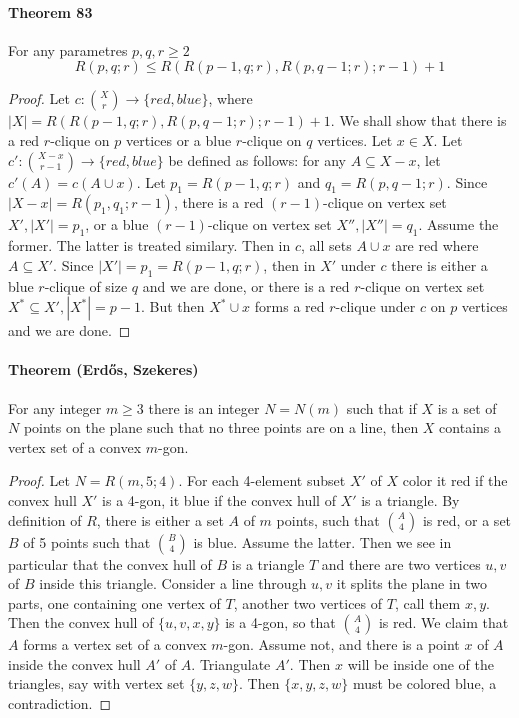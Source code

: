 \paragraph{Theorem 83} For any parametres $p,q,r \geq 2$
$$ R(p,q;r) \leq R(R(p-1,q;r), R(p,q-1;r);r-1) + 1 $$ 
\begin{proof}
    Let $c: \binom{X}{r} \to \{red,blue\}$, where 
    $|X| = R(R(p-1,q;r), R(p,q-1;r);r-1) + 1$. We shall show that there is a 
    red $r$-clique on $p$ vertices or a blue $r$-clique on $q$ vertices.
    Let $x \in X$. Let $c': \binom{X-x}{r-1} \to \{red,blue\}$ be defined 
    as follows: for any $A \subseteq X - x$, let $c'(A) = c(A \cup x)$. Let 
    $p_1 = R(p-1,q;r)$ and $q_1 = R(p,q-1;r)$. Since $|X-x| = R(p_1,q_1;r-1)$,
    there is a red $(r-1)$-clique on vertex set $X', |X'| = p_1$, or a blue 
    $(r-1)$-clique on vertex set $X'', |X''| = q_1$. Assume the former. The 
    latter is treated similary. Then in $c$, all sets $A \cup x$ are red where
    $A \subseteq X'$. Since $|X'| = p_1 = R(p-1,q;r)$, then in $X'$ under $c$
    there is either a blue $r$-clique of size $q$ and we are done, or there is 
    a red $r$-clique on vertex set $X^* \subseteq X', |X^*| = p-1$. But then
    $X^* \cup x$ forms a red $r$-clique under $c$ on $p$ vertices 
    and we are done.
\end{proof}

\paragraph{Theorem (Erd\H{o}s, Szekeres)} For any integer $m \geq 3$ there is 
an integer $N = N(m)$ such that if $X$ is a set of $N$ points on the plane 
such that no three points are on a line, then $X$ contains a vertex set
of a convex $m$-gon.
\begin{proof}
   Let $N = R(m,5;4)$. For each 4-element subset $X'$ of $X$ color it red if
   the convex hull $X'$ is a 4-gon, it blue if the convex hull of $X'$ is a 
   triangle. By definition of $R$, there is either a set $A$ of $m$ points, 
   such that $\binom{A}{4}$ is red, or a set $B$ of 5 points such that 
   $\binom{B}{4}$ is blue. Assume the latter. Then we see in particular that 
   the convex hull of $B$ is a triangle $T$ and there are two vertices $u,v$
   of $B$ inside this triangle. Consider a line through $u,v$ it splits the 
   plane in two parts, one containing one vertex of $T$, another 
   two vertices of $T$, call them $x,y$. Then the convex hull of $\{u,v,x,y\}$
   is a 4-gon, so that $\binom{A}{4}$ is red. We claim that $A$ forms a vertex 
   set of a convex $m$-gon. Assume not, and there is a point $x$ of $A$ inside 
   the convex hull $A'$ of $A$. Triangulate $A'$. Then $x$ will be inside
   one of the triangles, say with vertex set $\{y,z,w\}$. Then $\{x,y,z,w\}$
   must be colored blue, a contradiction.
\end{proof}
